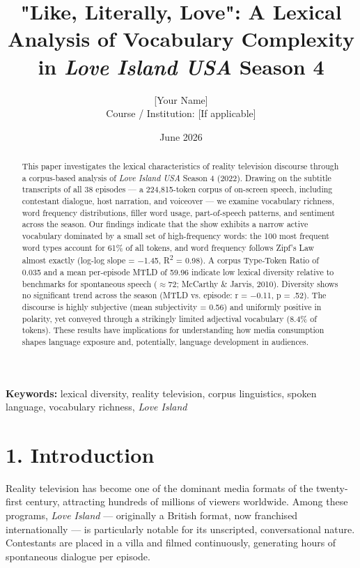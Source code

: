 \documentclass[11pt]{article}
\title{"Like, Literally, Love": A Lexical Analysis of Vocabulary Complexity in \emph{Love Island USA} Season 4}
\author{[Your Name]\\[2pt]\small Course / Institution: [If applicable]}
\date{June 2026}
\begin{document}
\maketitle
\begin{abstract}

This paper investigates the lexical characteristics of reality television discourse through a corpus-based analysis of \emph{Love Island USA} Season 4 (2022). Drawing on the subtitle transcripts of all 38 episodes --- a 224,815-token corpus of on-screen speech, including contestant dialogue, host narration, and voiceover --- we examine vocabulary richness, word frequency distributions, filler word usage, part-of-speech patterns, and sentiment across the season. Our findings indicate that the show exhibits a narrow active vocabulary dominated by a small set of high-frequency words: the 100 most frequent word types account for 61\% of all tokens, and word frequency follows Zipf's Law almost exactly (log-log slope = $-$1.45, R\textsuperscript{2} = 0.98). A corpus Type-Token Ratio of 0.035 and a mean per-episode MTLD of 59.96 indicate low lexical diversity relative to benchmarks for spontaneous speech ($\approx$72; McCarthy \& Jarvis, 2010). Diversity shows no significant trend across the season (MTLD vs. episode: r = $-$0.11, p = .52). The discourse is highly subjective (mean subjectivity = 0.56) and uniformly positive in polarity, yet conveyed through a strikingly limited adjectival vocabulary (8.4\% of tokens). These results have implications for understanding how media consumption shapes language exposure and, potentially, language development in audiences.

\end{abstract}
\smallskip\noindent\textbf{Keywords:} lexical diversity, reality television, corpus linguistics, spoken language, vocabulary richness, \emph{Love Island}


\section*{1. Introduction}

Reality television has become one of the dominant media formats of the twenty-first century, attracting hundreds of millions of viewers worldwide. Among these programs, \emph{Love Island} --- originally a British format, now franchised internationally --- is particularly notable for its unscripted, conversational nature. Contestants are placed in a villa and filmed continuously, generating hours of spontaneous dialogue per episode.
\end{document}
